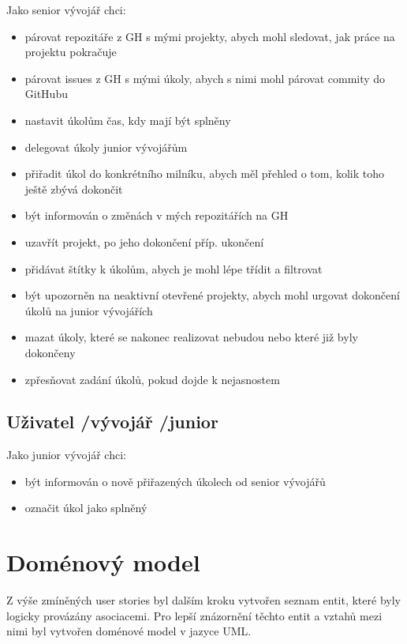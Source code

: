 Jako senior vývojář chci: 

\begin{itemize}
\item párovat repozitáře z GH s mými projekty, abych mohl sledovat, jak práce na projektu pokračuje
\item párovat issues z GH s mými úkoly, abych s nimi mohl párovat commity do GitHubu
\item nastavit úkolům čas, kdy mají být splněny
\item delegovat úkoly junior vývojářům
\item přiřadit úkol do konkrétního milníku, abych měl přehled o tom, kolik toho ještě zbývá dokončit
\item být informován o změnách v mých repozitářích na GH
\item uzavřít projekt, po jeho dokončení příp. ukončení
\item přidávat štítky k úkolům, abych je mohl lépe třídit a filtrovat
\item být upozorněn na neaktivní otevřené projekty, abych mohl urgovat dokončení úkolů na junior vývojářích
\item mazat úkoly, které se nakonec realizovat nebudou nebo které již byly dokončeny
\item zpřesňovat zadání úkolů, pokud dojde k nejasnostem
\end{itemize}

\subsection{Uživatel \slash  vývojář \slash  junior}

Jako junior vývojář chci:

\begin{itemize}
\item být informován o nově přiřazených úkolech od senior vývojářů
\item označit úkol jako splněný
\end{itemize}

\section{Doménový model}
Z výše zmíněných user stories byl dalším kroku vytvořen seznam entit, které byly logicky provázány asociacemi. Pro lepší znázornění těchto entit a vztahů mezi nimi byl vytvořen doménové model v jazyce UML.

